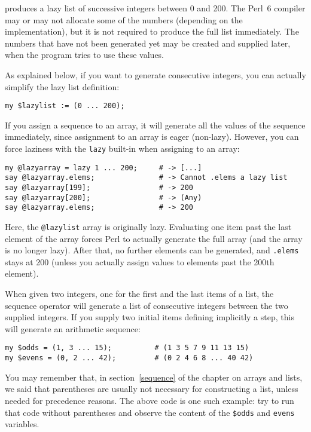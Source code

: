 produces a lazy list of successive integers between 0 and 200. 
The Perl~6 compiler may or may not allocate some of the numbers
(depending on the implementation), but it is not required to 
produce the full list immediately. The numbers that have not 
been generated yet may be created and supplied later, when 
the program tries to use these values. 

As explained below, if you want to generate consecutive 
integers, you can actually simplify the lazy list definition:

\begin{verbatim}
my $lazylist := (0 ... 200);
\end{verbatim}


If you assign a sequence to an array, it will generate 
all the values of the sequence immediately, since 
assignment to an array is eager (non-lazy).  However, 
you can force laziness with the  {\tt lazy} built-in 
when assigning to an array:

\begin{verbatim}
my @lazyarray = lazy 1 ... 200;     # -> [...]
say @lazyarray.elems;               # -> Cannot .elems a lazy list
say @lazyarray[199];                # -> 200
say @lazyarray[200];                # -> (Any)
say @lazyarray.elems;               # -> 200
\end{verbatim}

Here, the \verb'@lazylist' array is originally lazy. 
Evaluating one item past the last element of the array 
forces Perl to actually generate the full array (and the 
array is no longer lazy). After that, no further elements 
can be generated, and {\tt .elems} stays at 200 (unless 
you actually assign values to elements past the 200th 
element).

When given two integers, one for the first and the last items of 
a list, the sequence operator will generate a list of consecutive 
integers between the two supplied integers. If you supply two 
initial items defining implicitly a step, this will generate 
an arithmetic sequence:

\begin{verbatim}
my $odds = (1, 3 ... 15);          # (1 3 5 7 9 11 13 15)
my $evens = (0, 2 ... 42);         # (0 2 4 6 8 ... 40 42)
\end{verbatim}

You may remember that, in section~\ref{sequence} of the chapter 
on arrays and lists, we said that parentheses are usually not 
necessary for constructing a list, unless needed for 
precedence reasons. The above code is one such example: try 
to run that code without parentheses and observe the content 
of the \verb'$odds' and \verb'evens' variables.

